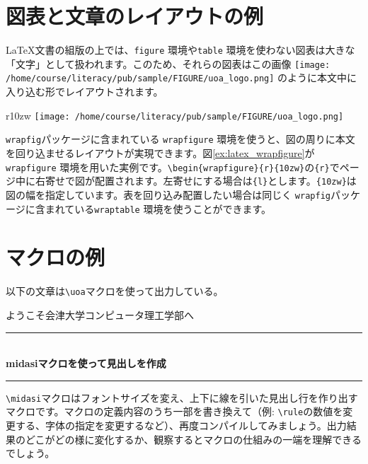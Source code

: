 \documentclass[platex,a4paper,12pt,dvipdfmx]{jsarticle}
\begin{document}
\newpage

\section{図表と文章のレイアウトの例}

{\LaTeX}文書の組版の上では、\texttt{figure} 環境や\texttt{table} 環境を使わない図表は大きな「文字」として扱われます。このため、それらの図表はこの画像 \texttt{[image: /home/course/literacy/pub/sample/FIGURE/uoa\_logo.png]} のように本文中に入り込む形でレイアウトされます。

\begin{wrapfigure}{r}{10zw}
\texttt{[image: /home/course/literacy/pub/sample/FIGURE/uoa\_logo.png]}
\caption{\texttt{wrapfigure} 環境を用いた図の配置の例}\label{ex:latex_wrapfigure}
\end{wrapfigure}

\texttt{wrapfig}パッケージに含まれている \texttt{wrapfigure} 環境を使うと、図の周りに本文を回り込ませるレイアウトが実現できます。図\ref{ex:latex_wrapfigure}が\texttt{wrapfigure} 環境を用いた実例です。\verb+\begin{wrapfigure}{r}{10zw}+の\verb+{r}+でページ中に右寄せで図が配置されます。左寄せにする場合は\verb+{l}+とします。\verb+{10zw}+は図の幅を指定しています。表を回り込み配置したい場合は同じく \texttt{wrapfig}パッケージに含まれている\texttt{wraptable} 環境を使うことができます。



\section{マクロの例}
\newcommand{\uoa}{会津大学コンピュータ理工学部}
\newcommand{\midasi}[1]{\vspace{0.5cm}\par\noindent%
\rule[2pt]{\textwidth}{1pt}\\{\large\gt\bf{#1}}\\%
\rule[8pt]{\textwidth}{2pt}\par\vspace{0.5cm}}

以下の文章は\texttt{{\textbackslash}uoa}マクロを使って出力している。

ようこそ{\uoa}へ

\midasi{midasiマクロを使って見出しを作成}

\texttt{{\textbackslash}midasi}マクロはフォントサイズを変え、上下に線を引いた見出し行を作り出すマクロです。マクロの定義内容のうち一部を書き換えて（例:
\texttt{{\textbackslash}rule}の数値を変更する、字体の指定を変更するなど）、再度コンパイルしてみましょう。出力結果のどこがどの様に変化するか、観察するとマクロの仕組みの一端を理解できるでしょう。
\end{document}
